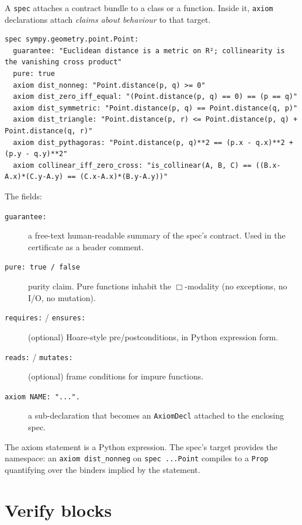 A \texttt{spec} attaches a contract bundle to a class or a function.
Inside it, \texttt{axiom} declarations attach \emph{claims about
behaviour} to that target.

\begin{lstlisting}[language=deppyfile,caption={Spec for
\texttt{sympy.geometry.point.Point}.}]
spec sympy.geometry.point.Point:
  guarantee: "Euclidean distance is a metric on R²; collinearity is the vanishing cross product"
  pure: true
  axiom dist_nonneg: "Point.distance(p, q) >= 0"
  axiom dist_zero_iff_equal: "(Point.distance(p, q) == 0) == (p == q)"
  axiom dist_symmetric: "Point.distance(p, q) == Point.distance(q, p)"
  axiom dist_triangle: "Point.distance(p, r) <= Point.distance(p, q) + Point.distance(q, r)"
  axiom dist_pythagoras: "Point.distance(p, q)**2 == (p.x - q.x)**2 + (p.y - q.y)**2"
  axiom collinear_iff_zero_cross: "is_collinear(A, B, C) == ((B.x-A.x)*(C.y-A.y) == (C.x-A.x)*(B.y-A.y))"
\end{lstlisting}

The fields:
\begin{description}
  \item[\texttt{guarantee:}] a free-text human-readable summary of the
  spec's contract.  Used in the certificate as a header comment.

  \item[\texttt{pure: true / false}] purity claim.  Pure functions
  inhabit the $\Box$-modality (no exceptions, no I/O, no mutation).

  \item[\texttt{requires:} / \texttt{ensures:}] (optional) Hoare-style
  pre/postconditions, in Python expression form.

  \item[\texttt{reads:} / \texttt{mutates:}] (optional) frame
  conditions for impure functions.

  \item[\texttt{axiom NAME: "...".}] a sub-declaration that becomes
  an \texttt{AxiomDecl} attached to the enclosing spec.
\end{description}

The axiom statement is a Python expression.  The spec's target
provides the namespace: an \texttt{axiom dist\_nonneg} on
\texttt{spec ...Point} compiles to a \Lean{} \texttt{Prop}
quantifying over the binders implied by the statement.

\section{Verify blocks}
\label{sec:verify-blocks}

